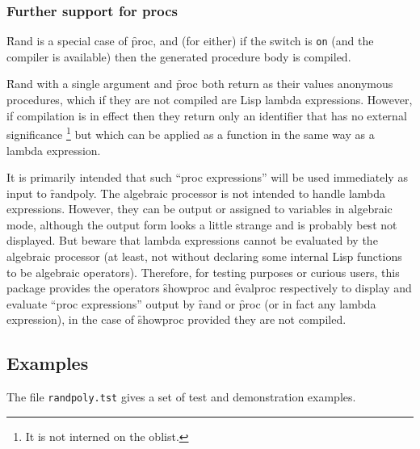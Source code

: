\subsubsection{Further support for procs}

\f{Rand} is a special case of \f{proc}, and (for either) if the
switch  is \texttt{on} (and the compiler is available) then the
generated procedure body is compiled.

\f{Rand} with a single argument and \f{proc} both return as their
values anonymous procedures, which if they are not compiled are Lisp
lambda expressions.  However, if compilation is in effect then they
return only an identifier that has no external significance%
\footnote{It is not interned on the oblist.} %
but which can be applied as a function in the same way as a lambda
expression.

\hypertarget{operator:SHOWPROC}{}
\hypertarget{operator:EVALPROC}{}
It is primarily intended that such ``proc expressions'' will be used
immediately as input to \f{randpoly}.  The algebraic processor is
not intended to handle lambda expressions.  However, they can be
output or assigned to variables in algebraic mode, although the output
form looks a little strange and is probably best not displayed.  But
beware that lambda expressions cannot be evaluated by the algebraic
processor (at least, not without declaring some internal Lisp
functions to be algebraic operators).  Therefore, for testing purposes
or curious users, this package provides the operators
\f{showproc} and
\f{evalproc} respectively to display and evaluate ``proc
expressions'' output by \f{rand} or \f{proc} (or in fact any
lambda expression), in the case of \f{showproc} provided they are
not compiled.


\subsection{Examples}
\label{randpolysec:Examples}

The file \texttt{randpoly.tst} gives a set of test and demonstration
examples.

